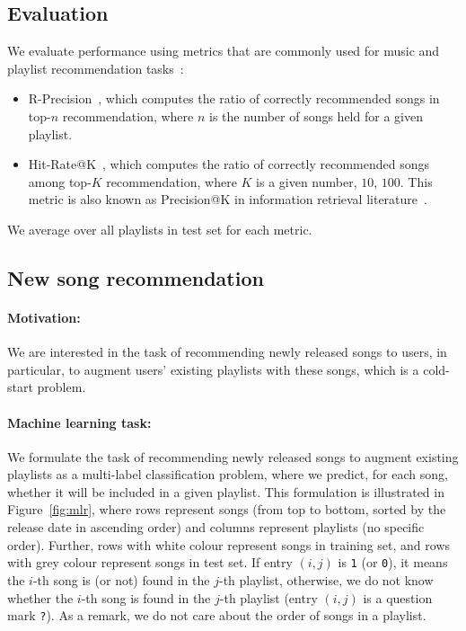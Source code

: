 \subsection{Evaluation}
We evaluate performance using metrics that are commonly used for music and playlist recommendation 
tasks~\cite{schedl2017,hariri2012context,jannach2015beyond}:
\begin{itemize}
\item R-Precision~\cite{manning2008introIR}, which computes the ratio of correctly recommended songs in top-$n$ recommendation, 
      where $n$ is the number of songs held for a given playlist.
\item Hit-Rate@K~\cite{hariri2012context}, which computes the ratio of correctly recommended songs among top-$K$ recommendation, 
      where $K$ is a given number, \eg $10$, $100$. 
      This metric is also known as Precision@K in information retrieval literature~\cite{manning2008introIR}.
\end{itemize}
We average over all playlists in test set for each metric.


\subsection{New song recommendation}
\label{ssec:newsongrec}

\paragraph{Motivation:} 
We are interested in the task of recommending newly released songs to users,
in particular, to augment users' existing playlists with these songs,
which is a cold-start problem.

\paragraph{Machine learning task:}
We formulate the task of recommending newly released songs to augment existing playlists
as a multi-label classification problem, where we predict, for each song, 
whether it will be included in a given playlist.
This formulation is illustrated in Figure~\ref{fig:mlr},
where rows represent songs (from top to bottom, sorted by the release date in ascending order)
and columns represent playlists (no specific order).
Further, rows with white colour represent songs in training set, and rows with grey colour represent songs in test set.
If entry $(i, j)$ is \texttt{1} (or \texttt{0}), it means the $i$-th song is (or not) found in the $j$-th playlist,
otherwise, we do not know whether the $i$-th song is found in the $j$-th playlist (\ie entry $(i, j)$ is a question mark \texttt{?}).
As a remark, we do not care about the order of songs in a playlist.


